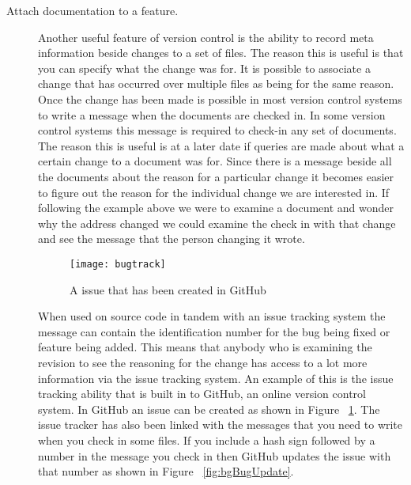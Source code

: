\begin{description}

  \item [Attach documentation to a feature.]
  Another useful feature of version control is the ability to record meta information beside changes to a set of files.  The reason this is useful is that you can specify what the change was for.  It is possible to associate a change that has occurred over multiple files as being for the same reason.  Once the change has been made is possible in most version control systems to write a message when the documents are checked in.  In some version control systems this message is required to check-in any set of documents.  The reason this is useful is at a later date if queries are made about what a certain change to a document was for.  Since there is a message beside all the documents about the reason for a particular change it becomes easier to figure out the reason for the individual change we are interested in. If following the example above we were to examine a document and wonder why the address changed we could examine the check in with that change and see the message that the person changing it wrote.

  \begin{figure}[!t]
   \begin{center}
    \texttt{[image: bugtrack]}
   \end{center}
   \caption{A issue that has been created in GitHub}
   \label{fig:bgBugTrack}
  \end{figure}

  When used on source code in tandem with an issue tracking system the message can contain the identification number for the bug being fixed or feature being added.  This means that anybody who is examining the revision to see the reasoning for the change has access to a lot more information via the issue tracking system. An example of this is the issue tracking ability that is built in to GitHub, an online version control system. In GitHub an issue can be created as shown in Figure ~\ref{fig:bgBugTrack}. The issue tracker has also been linked with the messages that you need to write when you check in some files. If you include a hash sign followed by a number in the message you check in then GitHub updates the issue with that number as shown in Figure ~\ref{fig:bgBugUpdate}.


\end{description}
